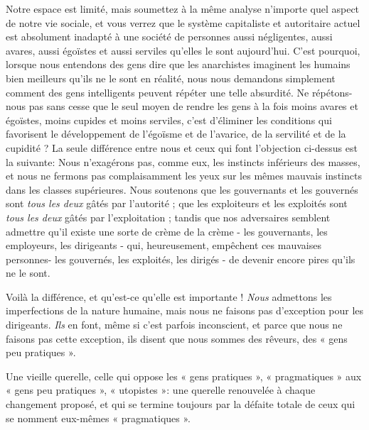 Notre espace est limité, mais soumettez à la même analyse n'importe quel aspect de notre vie sociale, et vous verrez que le système capitaliste et autoritaire actuel est absolument inadapté à une société de personnes aussi négligentes, aussi avares, aussi égoïstes et aussi serviles qu'elles le sont aujourd'hui. C'est pourquoi, lorsque nous entendons des gens dire que les anarchistes imaginent les humains bien meilleurs qu'ils ne le sont en réalité, nous nous demandons simplement comment des gens intelligents peuvent répéter une telle absurdité. Ne répétons-nous pas sans cesse que le seul moyen de rendre les gens à la fois moins avares et égoïstes, moins cupides et moins serviles, c'est d'éliminer les conditions qui favorisent le développement de l'égoïsme et de l’avarice, de la servilité et de la cupidité ? La seule différence entre nous et ceux qui font l'objection ci-dessus est la suivante: Nous n'exagérons pas, comme eux, les instincts inférieurs des masses, et nous ne fermons pas complaisamment les yeux sur les mêmes mauvais instincts dans les classes supérieures. Nous soutenons que les gouvernants et les gouvernés sont \emph{tous les deux} gâtés par l'autorité ; que les exploiteurs et les exploités sont \emph{tous les deux} gâtés par l'exploitation ; tandis que nos adversaires semblent admettre qu'il existe une sorte de crème de la crème - les gouvernants, les employeurs, les dirigeants - qui, heureusement, empêchent ces mauvaises personnes- les gouvernés, les exploités, les dirigés - de devenir encore pires qu'ils ne le sont.

Voilà la différence, et qu’est-ce qu’elle est importante ! \emph{Nous} admettons les imperfections de la nature humaine, mais nous ne faisons pas d'exception pour les dirigeants. \emph{Ils} en font, même si c'est parfois inconscient, et parce que nous ne faisons pas cette exception, ils disent que nous sommes des rêveurs, des « gens peu pratiques ».

Une vieille querelle, celle qui oppose les « gens pratiques », « pragmatiques » aux « gens peu pratiques », « utopistes »: une querelle renouvelée à chaque changement proposé, et qui se termine toujours par la défaite totale de ceux qui se nomment eux-mêmes « pragmatiques ».

